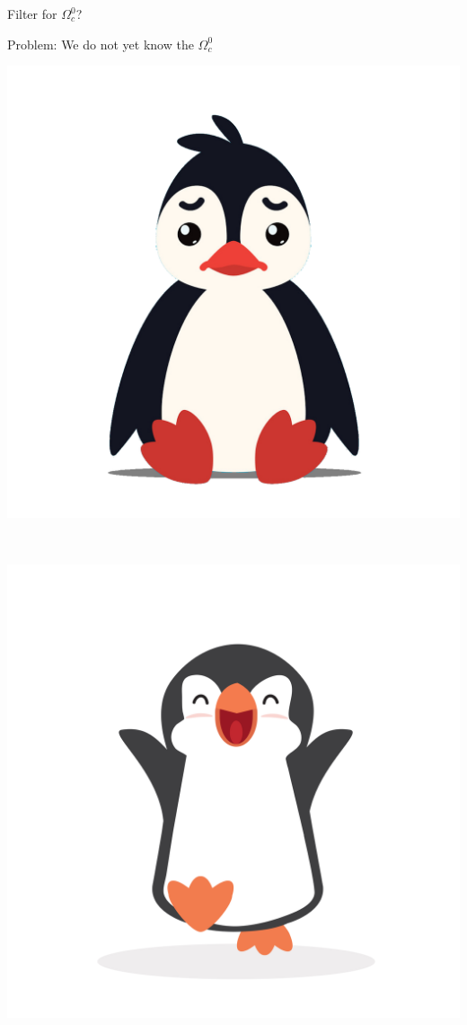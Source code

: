 \begin{frame}{Filter for $\Omega_c^0$?}
\begin{minipage}[c]{0.75\textwidth}
    Problem: We do not yet know the $\Omega_c^0$ \vspace{1cm}
\end{minipage}
\begin{minipage}[c]{0.2\textwidth}
\centering
    \includegraphics[width=\textwidth]{Figures Lecture on Datanalysis/sad-penguin3.png}
\end{minipage}\\
\vspace{0.5cm}%
\begin{minipage}[c]{0.2\textwidth}
\centering
    \includegraphics[width=\textwidth]{Figures Lecture on Datanalysis/happy-penguin2.jpeg}

\end{minipage}
\end{frame}
